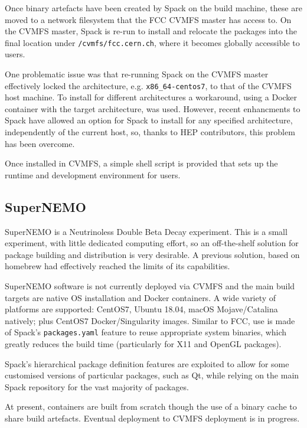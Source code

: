 \documentclass{webofc}
\begin{document}
Once binary artefacts have been created by Spack on the build machine,
these are moved to a network filesystem that the FCC CVMFS\cite{CVMFS} master
has access to. On the CVMFS master, Spack is re-run to install and relocate
the packages into the final location under \texttt{/cvmfs/fcc.cern.ch}, where
it becomes globally accessible to users.

One problematic issue was that re-running Spack on the CVMFS master effectively
locked the architecture, e.g. \texttt{x86\_64-centos7}, to that of the CVMFS
host machine. To install for different architectures a workaround, using a
Docker container with the target architecture, was used. However, recent
enhancments to Spack have allowed an option for Spack to install for any
specified architecture, independently of the current host, so, thanks to HEP
contributors, this problem has been overcome.

Once installed in CVMFS, a simple shell script is provided that sets up the
runtime and development environment for users.

\subsection{SuperNEMO}
\label{supernemo}

SuperNEMO\cite{Piquemal2006} is a Neutrinoless Double Beta Decay experiment.
This is a small experiment, with little dedicated computing effort, so
an off-the-shelf solution for package building and distribution is very 
desirable. A previous solution, based on homebrew\cite{homebrew} had effectively
reached the limits of its capabilities.

SuperNEMO software is not currently deployed via CVMFS and the main build targets are
native OS installation and Docker containers. A wide variety of platforms are
supported: CentOS7, Ubuntu 18.04, macOS Mojave/Catalina natively; plus CentOS7
Docker/Singularity images. Similar to FCC, use is made of Spack's
\texttt{packages.yaml} feature to reuse appropriate system binaries, which greatly
reduces the build time (particularly for X11 and OpenGL packages).

Spack's hierarchical package definition features are exploited to allow for
some customised versions of particular packages, such as Qt, while relying on
the main Spack repository for the vast majority of packages.

At present, containers are built from scratch though the use of a binary cache
to share build artefacts. Eventual deployment to CVMFS deployment is in progress.
\end{document}
